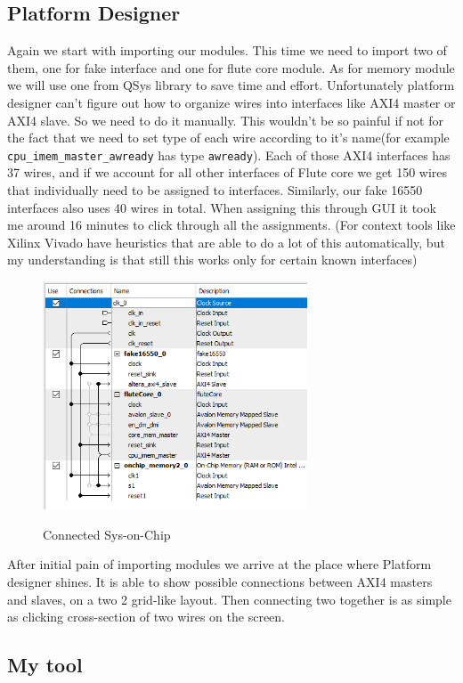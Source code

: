 \documentclass[14pt]{report}
\begin{document}
\subsection{Platform Designer}
Again we start with importing our modules. This time we need to import two of them, one for fake interface and one for flute core module. As for memory module we will use one from QSys library to save time and effort.
Unfortunately platform designer can't figure out how to organize wires into interfaces like AXI4 master or AXI4 slave. So we need to do it manually. This wouldn't be so painful if not for the fact that we need to set type of each wire according to it's name(for example \verb!cpu_imem_master_awready! has type \verb!awready!). Each of those AXI4 interfaces has 37 wires, and if we account for all other interfaces of Flute core we get 150 wires that individually need to be assigned to interfaces. Similarly, our fake 16550 interfaces also uses 40 wires in total. When assigning this through GUI it took me around 16 minutes to click through all the assignments. (For context tools like Xilinx Vivado have heuristics that are able to do a lot of this automatically, but my understanding is that still this works only for certain known interfaces)
\\
\begin{figure}
    \caption{Connected Sys-on-Chip}
    \includegraphics[width=0.7\textwidth]{images/Example2QSys.png} \\
    \centering
\end{figure}
After initial pain of importing modules we arrive at the place where Platform designer shines. It is able to show possible connections between AXI4 masters and slaves, on a two 2 grid-like layout. Then connecting two together is as simple as clicking cross-section of two wires on the screen.  

\subsection{My tool}
\end{document}
